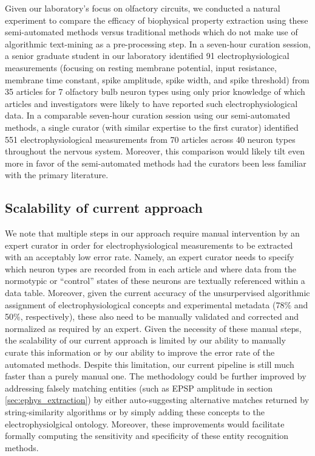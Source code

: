 \documentclass{template/frontiersSCNS} %
\begin{document}
Given our laboratory's focus on olfactory circuits, we conducted a natural experiment to compare the efficacy of biophysical property extraction using these semi-automated methods versus traditional methods which do not make use of algorithmic text-mining as a pre-processing step.  
In a seven-hour curation session, a senior graduate student in our laboratory identified 91 electrophysiological measurements (focusing on resting membrane potential, input resistance, membrane time constant, spike amplitude, spike width, and spike threshold) from 35 articles for 7 olfactory bulb neuron types using only prior knowledge of which articles and investigators were likely to have reported such electrophysiological data.  
In a comparable seven-hour curation session using our semi-automated methods, a single curator (with similar expertise to the first curator) identified 551 electrophysiological measurements from 70 articles across 40 neuron types throughout the nervous system.  
Moreover, this comparison would likely tilt even more in favor of the semi-automated methods had the curators been less familiar with the primary literature.

\subsection{Scalability of current approach}
We note that multiple steps in our approach require manual intervention by an expert curator in order for electrophysiological measurements to be extracted with an acceptably low error rate.  
Namely, an expert curator needs to specify which neuron types are recorded from in each article and where data from the normotypic or ``control'' states of these neurons are textually referenced within a data table.  
Moreover, given the current accuracy of the unsurpervised algorithmic assignment of electrophysiological concepts and experimental metadata (78\% and 50\%, respectively), these also need to be manually validated and corrected and normalized as required by an expert.  
Given the necessity of these manual steps, the scalability of our current approach is limited by our ability to manually curate this information or by our ability to improve the error rate of the automated methods.  
Despite this limitation, our current pipeline is still much faster than a purely manual one.  The methodology could be further improved by addressing falsely matching entities (such as EPSP amplitude in section \ref{sec:ephys_extraction}) by either auto-suggesting alternative matches returned by string-similarity algorithms or by simply adding these concepts to the electrophysiolgical ontology.  
Moreover, these improvements would facilitate formally computing the sensitivity and specificity of these entity recognition methods.
\end{document}
